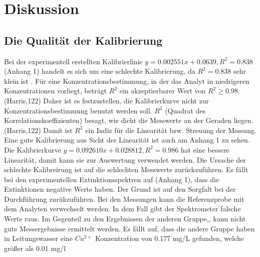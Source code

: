 \documentclass[12pt]{article}
\begin{document}
\section{Diskussion}
\subsection{Die Qualität der Kalibrierung}
Bei der experimentell erstellten Kalibrierlinie $y=0.002551x+0.0639, R^2 = 0.838$ (Anhang 1) handelt
es sich um eine schlechte Kalibrierung, da $R^2 = 0.838$ sehr klein ist .
Für eine Konzentrationsbestimmung, in der das Analyt in niedrigeren Konzentrationen vorliegt,
beträgt $R^2$ ein akzeptierbarer Wert von $R^2 \geq 0.98$. (Harris,122) Daher ist es festzustellen, die Kalibrierkurve
nicht zur Konzentrationsbestimmung benutzt werden soll.
$R^2$ (Quadrat des Korrelationskoeffizienten) besagt, wie dicht die Messwerte an der Geraden liegen. (Harris,122)
Damit ist $R^2$ ein Indiz für die Linearität bzw. Streuung der Messung.
Eine gute Kalibrierung aus Sicht der Linearität ist auch am Anhang 1 zu sehen.
Die Kalibrierkurve $y = 0.092610x + 0.028812, R^2 = 0.986$ hat eine bessere Linearität, damit kann sie
zur Auswertung verwendet werden.
Die Ursache der schlechte Kalibreirung ist auf die schlechten Messwerte zurückzuführen.
Es fällt bei den experimentellen Extinktionsspektren auf (Anhang 1), dass die Extinktionen negative Werte haben.
Der Grund ist auf den Sorgfalt bei der Durchführung zurükzuführen.
Bei den Messungen kann die Referenzprobe mit dem Analyten verwechselt werden. In dem Fall gibt der Spektrometer falsche Werte raus.
Im Gegenteil zu den Ergebnissen der anderen Gruppe,, kann nicht gute Messergebnisse ermittelt werden.
Es fällt auf, dass die andere Gruppe haben in Leitungswasser eine $Cu^{2+}$ Konzentration von 0.177 mg/L gefunden, welche
größer als 0.01 mg/l
\end{document}
